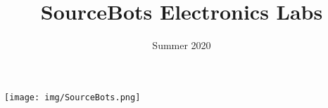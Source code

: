 \documentclass[a4paper,10pt]{article}
\title{{\titlefont SourceBots Electronics Labs}}
\date{Summer 2020}
\begin{document}
  \begin{titlepage}
    \maketitle
    \begin{center}
      \texttt{[image: img/SourceBots.png]}      
    \end{center}
  \end{titlepage}
  
  
  
  
  
  
\end{document}

